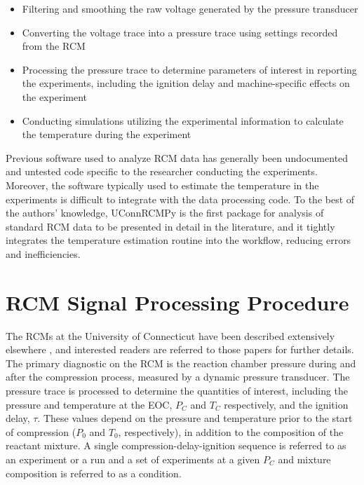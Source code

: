 \documentclass[12pt]{../ussci}
\begin{document}
\begin{itemize}
\item
  Filtering and smoothing the raw voltage generated by the pressure
  transducer
\item
  Converting the voltage trace into a pressure trace using settings
  recorded from the RCM
\item
  Processing the pressure trace to determine parameters of interest in
  reporting the experiments, including the ignition delay and
  machine-specific effects on the experiment
\item
  Conducting simulations utilizing the experimental information to
  calculate the temperature during the experiment
\end{itemize}

Previous software used to analyze RCM data has generally been
undocumented and untested code specific to the researcher conducting the
experiments. Moreover, the software typically used to estimate the
temperature in the experiments is difficult to integrate with the data
processing code. To the best of the authors' knowledge, UConnRCMPy is
the first package for analysis of standard RCM data to be presented in
detail in the literature, and it tightly integrates the temperature
estimation routine into the workflow, reducing errors and
inefficiencies.

\section{RCM Signal Processing Procedure}\label{rcm-signal-processing-procedure}

The RCMs at the University of Connecticut have been described extensively
elsewhere \autocite{Das2012,Mittal2007a}, and interested readers are referred to
those papers for further details. The primary diagnostic on the RCM is the
reaction chamber pressure during and after the compression process, measured by
a dynamic pressure transducer. The pressure trace is processed to determine the
quantities of interest, including the pressure and temperature at the EOC,
\(P_C\) and \(T_C\) respectively, and the ignition delay, \(\tau\). These values
depend on the pressure and temperature prior to the start of compression
(\(P_0\) and \(T_0\), respectively), in addition to the composition of the
reactant mixture. A single compression-delay-ignition sequence is
referred to as an experiment or a run and a set of experiments at a given
\(P_C\) and mixture composition is referred to as a condition.
\end{document}
